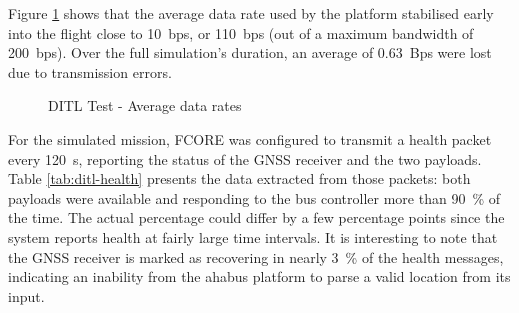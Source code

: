 Figure \ref{fig:ditl-bandwidth} shows that the average data rate used by the
platform stabilised early into the flight close to \SI{10}{bps}, or
\SI{110}{bps} (out of a maximum bandwidth of \SI{200}{bps}). Over the full
simulation's duration, an average of \SI{0.63}{Bps} were lost due to
transmission errors.

\begin{figure}[H]
\centering
\caption{DITL Test - Average data rates}
\label{fig:ditl-bandwidth}
\end{figure}

%
%
%
%
%

For the simulated mission, FCORE was configured to transmit a health packet
every \SI{120}{\second}, reporting the status of the GNSS receiver and the
two payloads. Table \ref{tab:ditl-health} presents the data extracted from those
packets: both payloads were available and responding to the bus controller more
than \SI{90}{\percent} of the time. The actual percentage could differ by a few
percentage points since the system reports health at fairly large time
intervals. It is interesting to note that the GNSS receiver is marked as
recovering in nearly \SI{3}{\percent} of the health messages, indicating an
inability from the \acrshort{ahabus} platform to parse a valid location from
its input.

